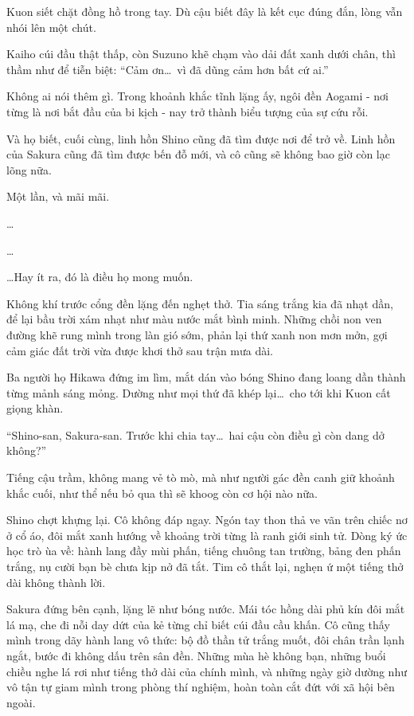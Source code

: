 \documentclass[../main.tex]{subfiles}
\begin{document}
Kuon siết chặt đồng hồ trong tay. Dù cậu biết đây là kết cục đúng đắn, lòng vẫn nhói lên một chút.

Kaiho cúi đầu thật thấp, còn Suzuno khẽ chạm vào dải đất xanh dưới chân, thì thầm như để tiễn biệt: ``Cảm ơn\dots\ vì đã dũng cảm hơn bất cứ ai.''

Không ai nói thêm gì. Trong khoảnh khắc tĩnh lặng ấy, ngôi đền Aogami - nơi từng là nơi bắt đầu của bi kịch - nay trở thành biểu tượng của sự cứu rỗi.

Và họ biết, cuối cùng, linh hồn Shino cũng đã tìm được nơi để trở về. Linh hồn của Sakura cũng đã tìm được bến đỗ mới, và cô cũng sẽ không bao giờ còn lạc lõng nữa.

Một lần, và mãi mãi.

\dots

\dots

\dots Hay ít ra, đó là điều họ mong muốn.

Không khí trước cổng đền lặng đến nghẹt thở. Tia sáng trắng kia đã nhạt dần, để lại bầu trời xám nhạt như màu nước mắt bình minh. Những chồi non ven đường khẽ rung mình trong làn gió sớm, phản lại thứ xanh non mơn mởn, gợi cảm giác đất trời vừa được khơi thở sau trận mưa dài.

Ba người họ Hikawa đứng im lìm, mắt dán vào bóng Shino đang loang dần thành từng mảnh sáng mỏng. Dường như mọi thứ đã khép lại\dots\ cho tới khi Kuon cất giọng khàn.

``Shino-san, Sakura-san. Trước khi chia tay\dots\ hai cậu còn điều gì còn dang dở không?''

Tiếng cậu trầm, không mang vẻ tò mò, mà như người gác đền canh giữ khoảnh khắc cuối, như thể nếu bỏ qua thì sẽ khoog còn cơ hội nào nữa.

Shino chợt khựng lại. Cô không đáp ngay. Ngón tay thon thả ve vãn trên chiếc nơ ở cổ áo, đôi mắt xanh hướng về khoảng trời từng là ranh giới sinh tử. Dòng ký ức học trò ùa về: hành lang đầy mùi phấn, tiếng chuông tan trường, bảng đen phấn trắng, nụ cười bạn bè chưa kịp nở đã tắt. Tim cô thắt lại, nghẹn ứ một tiếng thở dài không thành lời.

Sakura đứng bên cạnh, lặng lẽ như bóng nước. Mái tóc hồng dài phủ kín đôi mắt lá mạ, che đi nỗi day dứt của kẻ từng chỉ biết cúi đầu cầu khấn. Cô cũng thấy mình trong dãy hành lang vô thức: bộ đồ thần tử trắng muốt, đôi chân trần lạnh ngắt, bước đi không dấu trên sân đền. Những mùa hè không bạn, những buổi chiều nghe lá rơi như tiếng thở dài của chính mình, và những ngày giờ dường như vô tận tự giam mình trong phòng thí nghiệm, hoàn toàn cắt đứt với xã hội bên ngoài.
\end{document}

